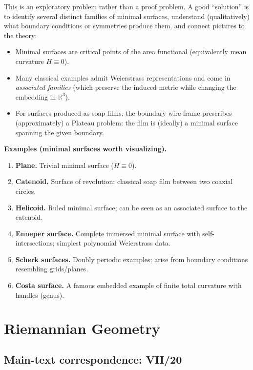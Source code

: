 \begin{solution}
This is an exploratory problem rather than a proof problem. A good ``solution'' is to identify several distinct families of
	minimal surfaces, understand (qualitatively) what boundary conditions or symmetries produce them, and connect pictures to the theory:
	\begin{itemize}
		\item Minimal surfaces are critical points of the area functional (equivalently mean curvature $H\equiv 0$).
		\item Many classical examples admit Weierstrass representations and come in \emph{associated families}
		(which preserve the induced metric while changing the embedding in $\mathbb R^3$).
		\item For surfaces produced as soap films, the boundary wire frame prescribes (approximately) a Plateau problem:
		the film is (ideally) a minimal surface spanning the given boundary.
	\end{itemize}
	
	\medskip
	\textbf{Examples (minimal surfaces worth visualizing).}
	\begin{enumerate}
		\item \textbf{Plane.} Trivial minimal surface ($H\equiv 0$).
		\item \textbf{Catenoid.} Surface of revolution; classical soap film between two coaxial circles.
		\item \textbf{Helicoid.} Ruled minimal surface; can be seen as an associated surface to the catenoid.
		\item \textbf{Enneper surface.} Complete immersed minimal surface with self-intersections; simplest polynomial Weierstrass data.
		\item \textbf{Scherk surfaces.} Doubly periodic examples; arise from boundary conditions resembling grids/planes.
		\item \textbf{Costa surface.} A famous embedded example of finite total curvature with handles (genus).
	\end{enumerate}

\end{solution}

\section{Riemannian Geometry}

\subsection*{Main-text correspondence: VII/20}

